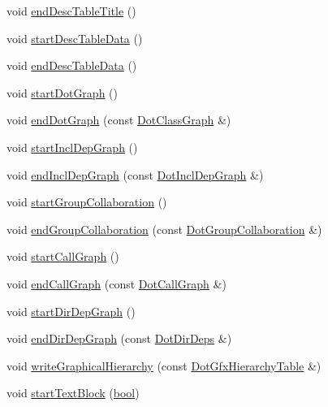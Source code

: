 \begin{DoxyCompactItemize}
\item 
void \hyperlink{class_man_generator_a27152804f9384ad60557157f5e5be5da}{end\+Desc\+Table\+Title} ()
\item 
void \hyperlink{class_man_generator_a1a7710a1e0c3c53a8729bda81863addc}{start\+Desc\+Table\+Data} ()
\item 
void \hyperlink{class_man_generator_a98fcb779ebc649bc817dc7ce7fd53caf}{end\+Desc\+Table\+Data} ()
\item 
void \hyperlink{class_man_generator_a0b197f55abd7fe194183ecee7aebe800}{start\+Dot\+Graph} ()
\item 
void \hyperlink{class_man_generator_aedc67f1074ac8e6281c395700bf6e9e5}{end\+Dot\+Graph} (const \hyperlink{class_dot_class_graph}{Dot\+Class\+Graph} \&)
\item 
void \hyperlink{class_man_generator_a6c38d1f8f00d0cf2c5c69417e54aa446}{start\+Incl\+Dep\+Graph} ()
\item 
void \hyperlink{class_man_generator_afb39cce552d143492bd625cd0a0dd0dc}{end\+Incl\+Dep\+Graph} (const \hyperlink{class_dot_incl_dep_graph}{Dot\+Incl\+Dep\+Graph} \&)
\item 
void \hyperlink{class_man_generator_a0e3edd731a18f4410530e8e32bbabb4f}{start\+Group\+Collaboration} ()
\item 
void \hyperlink{class_man_generator_ac3c761549d50b8dc14ca497ab9b319e8}{end\+Group\+Collaboration} (const \hyperlink{class_dot_group_collaboration}{Dot\+Group\+Collaboration} \&)
\item 
void \hyperlink{class_man_generator_ace53641e16c7bf64fbddc79178e6fc52}{start\+Call\+Graph} ()
\item 
void \hyperlink{class_man_generator_afe6604d384542e566b828739a2c683cd}{end\+Call\+Graph} (const \hyperlink{class_dot_call_graph}{Dot\+Call\+Graph} \&)
\item 
void \hyperlink{class_man_generator_a6b4472b2eefeb5376c745f25bf4f0311}{start\+Dir\+Dep\+Graph} ()
\item 
void \hyperlink{class_man_generator_a8b3fafcb2963a874643dcacbc378a58f}{end\+Dir\+Dep\+Graph} (const \hyperlink{class_dot_dir_deps}{Dot\+Dir\+Deps} \&)
\item 
void \hyperlink{class_man_generator_a29e42193144cbcafd32527f0bf85c7e3}{write\+Graphical\+Hierarchy} (const \hyperlink{class_dot_gfx_hierarchy_table}{Dot\+Gfx\+Hierarchy\+Table} \&)
\item 
void \hyperlink{class_man_generator_a920fb8d9e9cdcc0959069d9f0f7a4ff4}{start\+Text\+Block} (\hyperlink{qglobal_8h_a1062901a7428fdd9c7f180f5e01ea056}{bool})

\end{DoxyCompactItemize}
